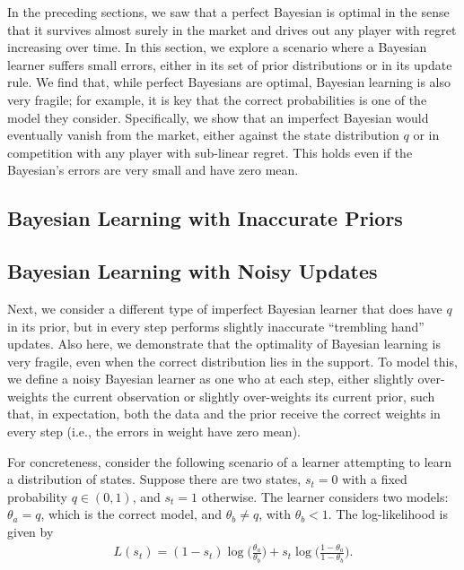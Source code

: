 In the preceding sections, we saw that a perfect Bayesian is optimal in the sense that it survives almost surely in the market and drives out any player with regret increasing over time. In this section, we explore a scenario where a Bayesian learner suffers small errors, either in its set of prior distributions or in its update rule. We find that, while perfect Bayesians are optimal, Bayesian learning is also very fragile; for example, it is key that the correct probabilities is one of the model they  consider. Specifically, we show that an imperfect Bayesian would eventually vanish from the market, either against the state distribution $q$ or in competition with any player with sub-linear regret. This holds even if the Bayesian's errors are very small and have zero mean.
 
\subsection{Bayesian Learning with Inaccurate Priors}\label{sec:noisy-priors-Bayesian}



\subsection{Bayesian Learning with Noisy Updates}\label{sec:noisy-Bayesian}
Next, we consider a different type of imperfect Bayesian learner that does have $q$ in its prior, but in every step performs slightly inaccurate ``trembling hand'' updates. Also here, we demonstrate that the optimality of Bayesian learning is very fragile, even when the correct distribution lies in the support. To model this, we define a noisy Bayesian learner as one who at each step, either slightly over-weights the current observation or slightly over-weights its current prior, such that, in expectation, both the data and the prior receive the correct weights in every step (i.e., the errors in weight have zero mean).

For concreteness, consider the following scenario of a learner attempting to learn a distribution of states. Suppose there are two states, $s_t = 0$ with a fixed probability $q \in (0,1)$, and $s_t = 1$ otherwise. The learner considers two models: $\theta_a = q$, which is the correct model, and $\theta_b \neq q$, with $\theta_b < 1$. The log-likelihood is given by
\begin{align}
    L(s_t) = 
    (1 - s_t) \log\Big(\frac{\theta_a}{\theta_b}\Big) + 
    s_t \log\Big(\frac{1 - \theta_a}{1 - \theta_b}\Big).
\end{align}

